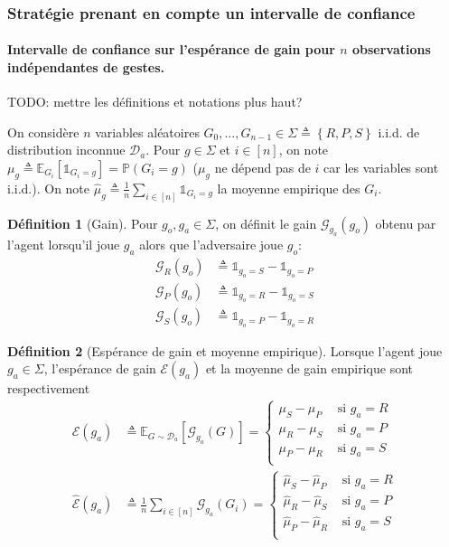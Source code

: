 \documentclass[10pt,a4paper]{article}
\theoremstyle{plain} %
\theoremstyle{definition} %
\newtheorem{definition}{Définition}
\theoremstyle{remark} %
\newcommand{\expectation}[2]{\mathbb{E}_{#1}\left [#2\right ]}
\newcommand{\one}[1]{\mathds{1}_{#1}}
\newcommand{\proba}[1]{\mathbb{P}\left (#1\right )}
\newcommand{\gain}[2]{\mathcal{G}_{#1}\left (#2\right )}
\newcommand{\espgain}[1]{\mathcal{E}\left (#1\right )}
\newcommand{\moygain}[1]{\widehat{\mathcal{E}}\left (#1\right )}
\begin{document}
\subsubsection{Stratégie prenant en compte un intervalle de confiance}


\paragraph{Intervalle de confiance sur l'espérance de gain pour $n$ observations indépendantes de gestes.}

TODO: mettre les définitions et notations plus haut?

On considère $n$ variables aléatoires $G_{0}, \ldots, G_{n-1}\in\Sigma\triangleq\left \lbrace R, P, S\right \rbrace$ i.i.d. de distribution inconnue $\mathcal{D}_a$.
Pour $g\in\Sigma$ et $i\in\left [n\right ]$, on note $\mu_g \triangleq \expectation{G_i}{\one{G_i=g}}=\proba{G_i=g}$ ($\mu_g$ ne dépend pas de $i$ car les variables sont i.i.d.).
On note $\widehat{\mu}_g\triangleq\frac{1}{n}\sum_{i\in\left [n\right ]} \one{G_i=g}$ la moyenne empirique des $G_i$.

\begin{definition}[Gain]
Pour $g_o, g_a\in\Sigma$, on définit le gain $\gain{g_a}{g_o}$ obtenu par l'agent lorsqu'il joue $g_a$ alors que l'adversaire joue $g_o$:
\begin{align}
\gain{R}{g_o} & \triangleq \one{g_o=S} - \one{g_o=P}\\
\gain{P}{g_o} & \triangleq \one{g_o=R} - \one{g_o=S}\\
\gain{S}{g_o} & \triangleq \one{g_o=P} - \one{g_o=R}
\end{align}
\end{definition}

\begin{definition}[Espérance de gain et moyenne empirique]
Lorsque l'agent joue $g_a\in\Sigma$, l'espérance de gain $\espgain{g_a}$ et la moyenne de gain empirique sont respectivement
\begin{align}
\espgain{g_a} & \triangleq \expectation{G\sim\mathcal{D}_a}{\gain{g_a}{G}}
=
\begin{cases}
\mu_S - \mu_P & \text{ si } g_a = R\\
\mu_R - \mu_S & \text{ si } g_a = P\\
\mu_P - \mu_R & \text{ si } g_a = S\\
\end{cases} \label{eqn:expected_gain}\\
\moygain{g_a} & \triangleq 
\frac{1}{n} \sum_{i\in\left [n\right ]} \gain{g_a}{G_i}
=
\begin{cases}
\widehat{\mu}_S - \widehat{\mu}_P & \text{ si } g_a = R\\
\widehat{\mu}_R - \widehat{\mu}_S & \text{ si } g_a = P\\
\widehat{\mu}_P - \widehat{\mu}_R & \text{ si } g_a = S\\
\end{cases}\label{eqn:average_gain}
\end{align}
\end{definition}
\end{document}
